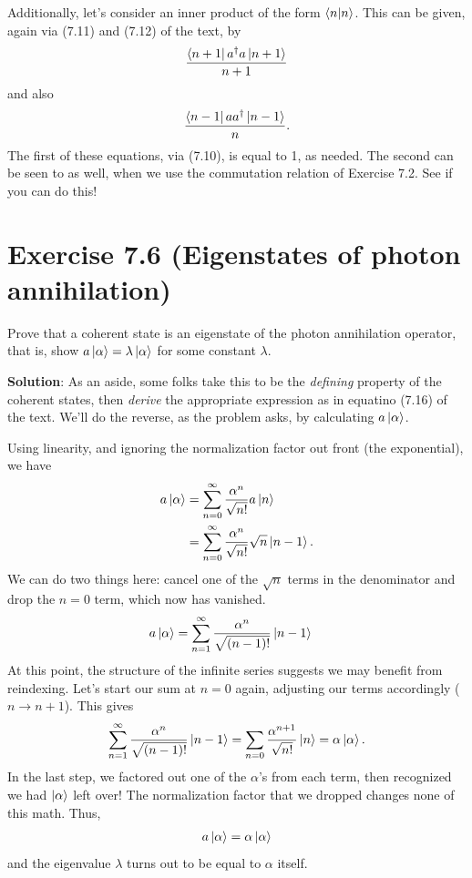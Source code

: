 \documentclass{book}
\begin{document}
    Additionally, let's consider an inner product of the form $\bra{n}\ket{n}$. This can be given, again via (7.11) and (7.12) of the text, by
    \begin{align}
        \frac{\bra{n+1}a^\dagger a \ket{n+1}}{n+1}
    \end{align}
    and also 
    \begin{align}
        \frac{\bra{n-1}a a^\dagger \ket{n-1}}{n}.
    \end{align}
    The first of these equations, via (7.10), is equal to 1, as needed. The second can be seen to as well, when we use the commutation relation of Exercise 7.2. See if you can do this!

\section*{Exercise 7.6 (Eigenstates of photon annihilation)}
    Prove that a coherent state is an eigenstate of the photon annihilation operator, that is, show $a\ket{\alpha} = \lambda \ket{\alpha}$ for some constant $\lambda$.

    \textbf{Solution}: As an aside, some folks take this to be the \emph{defining} property of the coherent states, then \emph{derive} the appropriate expression as in equatino (7.16) of the text. We'll do the reverse, as the problem asks, by calculating $a\ket{\alpha}$.

    Using linearity, and ignoring the normalization factor out front (the exponential), we have
    \begin{align}
    \begin{aligned}
        a\ket{\alpha} &= \sum_{n=0}^\infty \frac{\alpha^n}{\sqrt{n!}} a \ket{n} \\
        &= \sum_{n=0}^\infty \frac{\alpha^n}{\sqrt{n!}} \sqrt{n} \ket{n-1}.
    \end{aligned}
    \end{align}
    We can do two things here: cancel one of the $\sqrt{n}$ terms in the denominator and drop the $n = 0$ term, which now has vanished.
    \begin{align}
        a\ket{\alpha} &= \sum_{n=1}^\infty \frac{\alpha^n}{\sqrt{(n-1)!}}  \ket{n-1}
    \end{align}
    At this point, the structure of the infinite series suggests we may benefit from reindexing. Let's start our sum at $n = 0$ again, adjusting our terms accordingly ($n \to n + 1$). This gives
    \begin{align}
        \sum_{n=1}^\infty \frac{\alpha^n}{\sqrt{(n-1)!}}  \ket{n-1} = \sum_{n=0}\frac{\alpha^{n+1}}{\sqrt{n!}}  \ket{n} = \alpha \ket{\alpha}.
    \end{align}
    In the last step, we factored out one of the $\alpha$'s from each term, then recognized we had $\ket{\alpha}$ left over! The normalization factor that we dropped changes none of this math. Thus,
    \begin{align}
        a \ket{\alpha} = \alpha \ket{\alpha}
    \end{align}
    and the eigenvalue $\lambda$ turns out to be equal to $\alpha$ itself.
\end{document}
